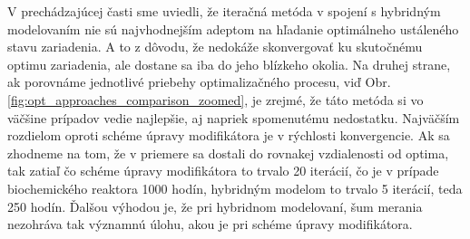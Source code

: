V prechádzajúcej časti sme uviedli, že iteračná metóda v spojení s hybridným modelovaním
nie sú najvhodnejším adeptom na hľadanie optimálneho ustáleného stavu zariadenia. A to z dôvodu, že nedokáže skonvergovať ku skutočnému optimu zariadenia, ale dostane sa iba do jeho blízkeho okolia. Na druhej strane, ak porovnáme jednotlivé priebehy optimalizačného procesu, viď Obr. \ref{fig:opt_approaches_comparison_zoomed}, je zrejmé, že táto metóda si vo väčšine prípadov vedie najlepšie, aj napriek spomenutému nedostatku. Najväčším rozdielom oproti schéme úpravy modifikátora je v rýchlosti konvergencie. Ak sa zhodneme na tom, že v priemere sa dostali do rovnakej vzdialenosti od optima, tak zatiaľ čo schéme úpravy modifikátora to trvalo 20 iterácií, čo je v prípade biochemického reaktora 1000 hodín, hybridným modelom to trvalo 5 iterácií, teda 250 hodín. Ďalšou výhodou je, že pri hybridnom modelovaní, šum merania nezohráva tak významnú úlohu, akou je pri schéme úpravy modifikátora. 
